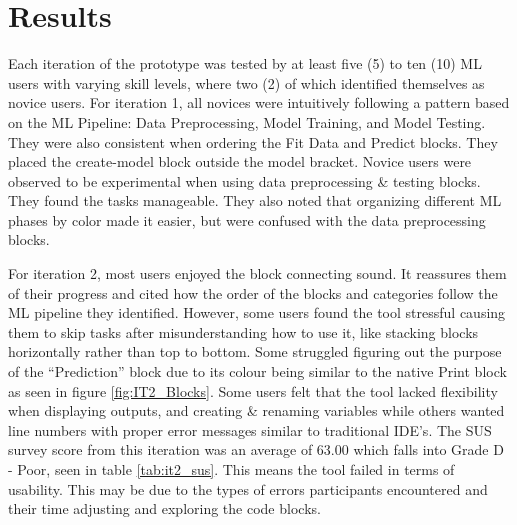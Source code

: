 \documentclass{sigchi-ext}
\begin{document}
\section{Results}

Each iteration of the prototype was tested by at least five (5) to ten (10) ML users with varying skill levels, where two (2) of which identified themselves as novice users.
For iteration 1, all novices were intuitively following a pattern based on the ML Pipeline: Data Preprocessing, Model Training, and Model Testing. They were also consistent when ordering the Fit Data and Predict blocks. They placed the create-model block outside the model bracket. Novice users were observed to be experimental when using data preprocessing & testing blocks. They found the tasks manageable. They also noted that organizing different ML phases by color made it easier, but were confused with the data preprocessing blocks. 


For iteration 2, most users enjoyed the block connecting sound. It reassures them of their progress and cited how the order of the blocks and categories follow the ML pipeline they identified. However, some users found the tool stressful causing them to skip tasks after misunderstanding how to use it, like stacking blocks horizontally rather than top to bottom. Some struggled figuring out the purpose of the ``Prediction'' block due to its colour being similar to the native Print block as seen in figure \ref{fig:IT2_Blocks}. Some users felt that the tool lacked flexibility when displaying outputs, and creating \& renaming variables while others wanted line numbers with proper error messages similar to traditional IDE's. The SUS survey score from this iteration was an average of 63.00 which falls into Grade D - Poor, seen in table \ref{tab:it2_sus}. This means the tool failed in terms of usability. This may be due to the types of errors participants encountered and their time adjusting and exploring the code blocks. 
\end{document}
